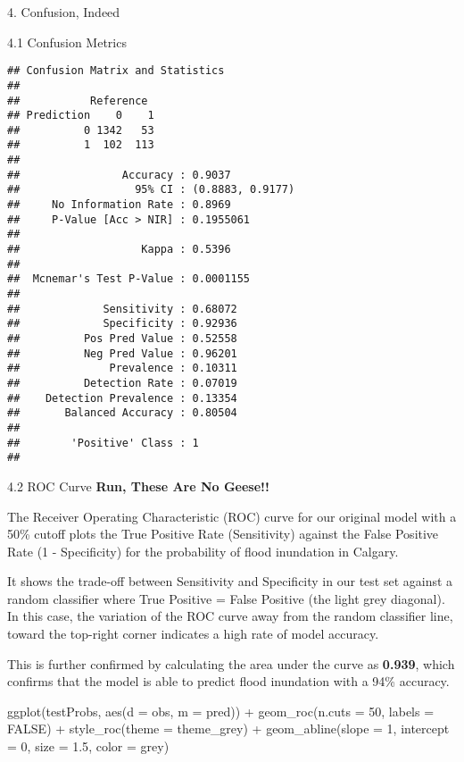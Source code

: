 \documentclass[
  ignorenonframetext,
]{beamer}
\newenvironment{Shaded}{\begin{snugshade}}{\end{snugshade}}
\newcommand{\AttributeTok}[1]{\textcolor[rgb]{0.77,0.63,0.00}{#1}}
\newcommand{\ConstantTok}[1]{\textcolor[rgb]{0.00,0.00,0.00}{#1}}
\newcommand{\DecValTok}[1]{\textcolor[rgb]{0.00,0.00,0.81}{#1}}
\newcommand{\FloatTok}[1]{\textcolor[rgb]{0.00,0.00,0.81}{#1}}
\newcommand{\FunctionTok}[1]{\textcolor[rgb]{0.00,0.00,0.00}{#1}}
\newcommand{\NormalTok}[1]{#1}
\newcommand{\SpecialCharTok}[1]{\textcolor[rgb]{0.00,0.00,0.00}{#1}}
\newcommand{\StringTok}[1]{\textcolor[rgb]{0.31,0.60,0.02}{#1}}
\begin{document}
\begin{frame}[fragile]{4. Confusion, Indeed}
\begin{block}{4.1 Confusion Metrics}
\begin{verbatim}
## Confusion Matrix and Statistics
## 
##           Reference
## Prediction    0    1
##          0 1342   53
##          1  102  113
##                                           
##                Accuracy : 0.9037          
##                  95% CI : (0.8883, 0.9177)
##     No Information Rate : 0.8969          
##     P-Value [Acc > NIR] : 0.1955061       
##                                           
##                   Kappa : 0.5396          
##                                           
##  Mcnemar's Test P-Value : 0.0001155       
##                                           
##             Sensitivity : 0.68072         
##             Specificity : 0.92936         
##          Pos Pred Value : 0.52558         
##          Neg Pred Value : 0.96201         
##              Prevalence : 0.10311         
##          Detection Rate : 0.07019         
##    Detection Prevalence : 0.13354         
##       Balanced Accuracy : 0.80504         
##                                           
##        'Positive' Class : 1               
## 
\end{verbatim}
\end{block}

\begin{block}{4.2 ROC Curve}
\protect\hypertarget{roc-curve}{}
\textbf{Run, These Are No Geese!!}

The Receiver Operating Characteristic (ROC) curve for our original model
with a 50\% cutoff plots the True Positive Rate (Sensitivity) against
the False Positive Rate (1 - Specificity) for the probability of flood
inundation in Calgary.

It shows the trade-off between Sensitivity and Specificity in our test
set against a random classifier where True Positive = False Positive
(the light grey diagonal). In this case, the variation of the ROC curve
away from the random classifier line, toward the top-right corner
indicates a high rate of model accuracy.

This is further confirmed by calculating the area under the curve as
\textbf{0.939}, which confirms that the model is able to predict flood
inundation with a 94\% accuracy.

\begin{Shaded}
\begin{Highlighting}[]
\FunctionTok{ggplot}\NormalTok{(testProbs, }\FunctionTok{aes}\NormalTok{(}\AttributeTok{d =}\NormalTok{ obs, }\AttributeTok{m =}\NormalTok{ pred)) }\SpecialCharTok{+} 
  \FunctionTok{geom\_roc}\NormalTok{(}\AttributeTok{n.cuts =} \DecValTok{50}\NormalTok{, }\AttributeTok{labels =} \ConstantTok{FALSE}\NormalTok{) }\SpecialCharTok{+} 
  \FunctionTok{style\_roc}\NormalTok{(}\AttributeTok{theme =}\NormalTok{ theme\_grey) }\SpecialCharTok{+}
  \FunctionTok{geom\_abline}\NormalTok{(}\AttributeTok{slope =} \DecValTok{1}\NormalTok{, }\AttributeTok{intercept =} \DecValTok{0}\NormalTok{, }\AttributeTok{size =} \FloatTok{1.5}\NormalTok{, }\AttributeTok{color =} \StringTok{\textquotesingle{}grey\textquotesingle{}}\NormalTok{) }
\end{Highlighting}
\end{Shaded}


\end{block}
\end{frame}
\end{document}
